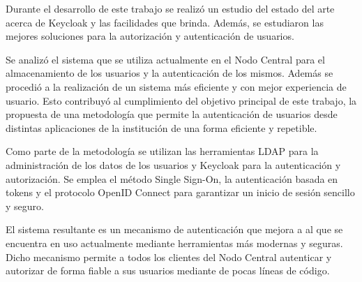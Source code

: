 \begin{conclusions}
    Durante el desarrollo de este trabajo se realizó un estudio del estado del arte acerca de Keycloak y las facilidades que brinda. Además, se estudiaron las mejores soluciones para la autorización y autenticación de usuarios.
    
    Se analizó el sistema que se utiliza actualmente en el Nodo Central para el almacenamiento de los usuarios y la autenticación de los mismos. Además se procedió a la realización de un sistema más eficiente y con mejor experiencia de usuario. Esto contribuyó al cumplimiento del objetivo principal de este trabajo, la propuesta de una metodología que permite la autenticación de usuarios desde distintas aplicaciones de la institución de una forma eficiente y repetible.
    
    Como parte de la metodología se utilizan las herramientas LDAP para la administración de los datos de los usuarios y Keycloak para la autenticación y autorización. Se emplea el método Single Sign-On, la autenticación basada en tokens y el protocolo OpenID Connect para garantizar un inicio de sesión sencillo y seguro.
    
    El sistema resultante es un mecanismo de autenticación que mejora a al que se encuentra en uso actualmente mediante herramientas más modernas y seguras. Dicho mecanismo permite a todos los clientes del Nodo Central autenticar y autorizar de forma fiable a sus usuarios mediante de pocas líneas de código.
\end{conclusions}
